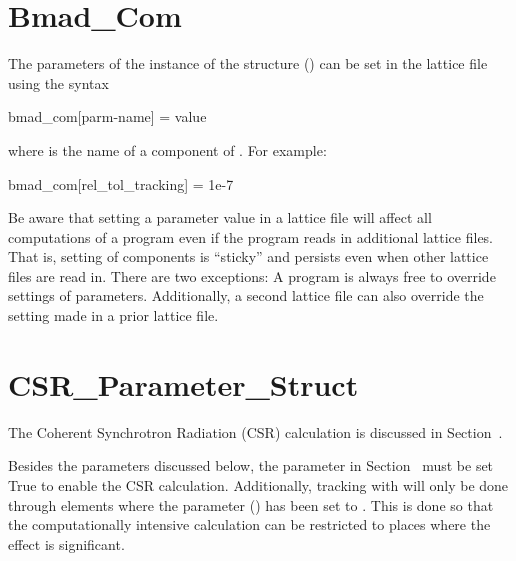 \section{Bmad_Com}
\label{s:bmad.com}

The parameters of the  instance of the
 structure () can be set in
the lattice file using the syntax
\begin{example}
  bmad_com[parm-name] = value
\end{example}
where  is the name of a component of
. For example:
\begin{example}
  bmad_com[rel_tol_tracking] = 1e-7
\end{example}

Be aware that setting a  parameter value in a lattice
file will affect all computations of a program even if the program
reads in additional lattice files. That is, setting of 
components is ``sticky'' and persists even when other lattice files
are read in. There are two exceptions: A program is always free to
override settings of  parameters. Additionally, a second
lattice file can also override the setting made in a prior lattice
file.

\section{CSR_Parameter_Struct}
\label{s:csr.params}

The Coherent Synchrotron Radiation (CSR) calculation is discussed in Section~.

Besides the parameters discussed below, the  parameter in
Section~ must be set True to enable the CSR calculation. Additionally, tracking
with  will only be done through elements where the parameter 
() has been set to . This is done so that the computationally intensive
 calculation can be restricted to places where the  effect is significant.

